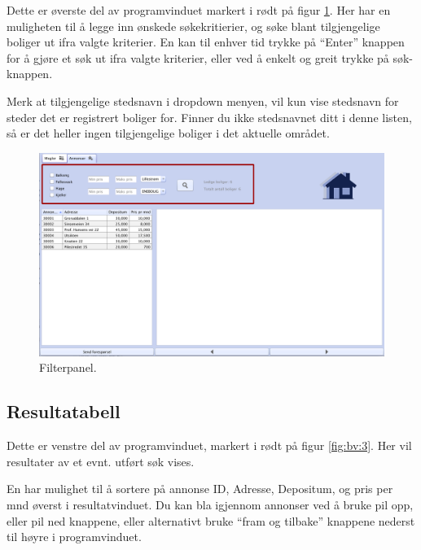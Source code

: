 Dette er øverste del av programvinduet markert i rødt på figur \ref{fig:bv:2}. Her har en muligheten til å
legge inn ønskede søkekritierier, og søke blant tilgjengelige boliger ut ifra valgte kriterier.
En kan til enhver tid trykke på “Enter” knappen for å gjøre et søk ut ifra valgte kriterier, eller ved å
enkelt og greit trykke på søk-knappen.

Merk at tilgjengelige stedsnavn i dropdown menyen, vil kun vise stedsnavn for steder det er
registrert boliger for. Finner du ikke stedsnavnet ditt i denne listen, så er det heller ingen
tilgjengelige boliger i det aktuelle området.



\begin{figure}[h!]
 \includegraphics[width=\textwidth,height=\textheight,keepaspectratio]{./img/brukerveiledning/2.png}
 \caption{Filterpanel.}
 \label{fig:bv:2}
\end{figure}




\newpage
\subsection{Resultatabell}
Dette er venstre del av programvinduet, markert i rødt på figur \ref{fig:bv:3}.
Her vil resultater av et evnt. utført søk vises.

En har mulighet til å sortere på annonse ID, Adresse, Depositum, og pris per mnd øverst i
resultatvinduet. Du kan bla igjennom annonser ved å bruke pil opp, eller pil ned knappene, eller
alternativt bruke “fram og tilbake” knappene nederst til høyre i programvinduet.



